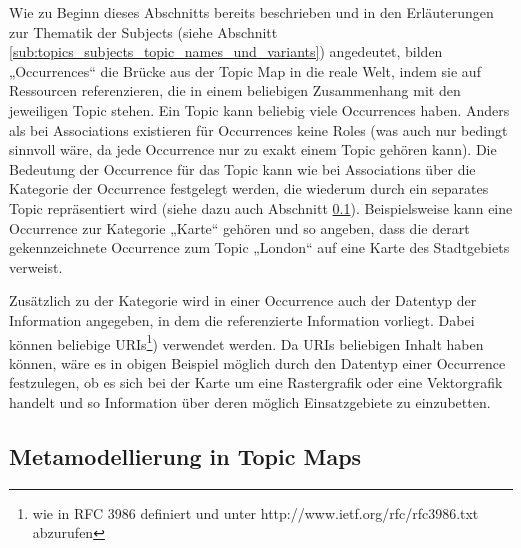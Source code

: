 Wie zu Beginn dieses Abschnitts bereits beschrieben und in den Erläuterungen zur Thematik der Subjects (siehe Abschnitt \ref{sub:topics_subjects_topic_names_und_variants}) angedeutet, bilden „Occurrences“ die Brücke aus der Topic Map in die reale Welt, indem sie auf Ressourcen referenzieren, die in einem beliebigen Zusammenhang mit den jeweiligen Topic stehen. Ein Topic kann beliebig viele Occurrences haben. Anders als bei Associations existieren für Occurrences keine Roles (was auch nur bedingt sinnvoll wäre, da jede Occurrence nur zu exakt einem Topic gehören kann). Die Bedeutung der Occurrence für das Topic kann wie bei Associations über die Kategorie der Occurrence festgelegt werden, die wiederum durch ein separates Topic repräsentiert wird (siehe dazu auch Abschnitt \ref{sub:metamodellierung_in_topic_maps}). Beispielsweise kann eine Occurrence zur Kategorie „Karte“ gehören und so angeben, dass die derart gekennzeichnete Occurrence zum Topic „London“ auf eine Karte des Stadtgebiets verweist.

Zusätzlich zu der Kategorie wird in einer Occurrence auch der Datentyp der Information angegeben, in dem die referenzierte Information vorliegt. Dabei können beliebige \glspl{URI}\footnote{wie in RFC 3986 definiert und unter http://www.ietf.org/rfc/rfc3986.txt abzurufen}) verwendet werden. Da URIs beliebigen Inhalt haben können, wäre es in obigen Beispiel möglich durch den Datentyp einer Occurrence festzulegen, ob es sich bei der Karte um eine Rastergrafik oder eine Vektorgrafik handelt und so Information über deren möglich Einsatzgebiete zu einzubetten.


\subsection{Metamodellierung in Topic Maps} %
\label{sub:metamodellierung_in_topic_maps}

